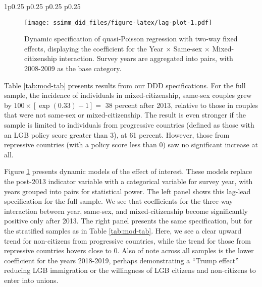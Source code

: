 \documentclass[
  12pt,
]{article}
\begin{document}
\begin{table}[ht]
\begin{centerbox}
\begin{threeparttable}
\begin{tabularx}{1\textwidth}{p{} p{} p{} p{}}
 \tabularnewline[-0.5pt]


\hhline{}
\end{tabularx}
\end{threeparttable}\par\end{centerbox}

\end{table}
 

\begin{figure}
\centering
\texttt{[image: ssimm\_did\_files/figure-latex/lag-plot-1.pdf]}
\caption{\label{fig:lag-plot}Dynamic specification of quasi-Poisson regression with two-way fixed effects, displaying the coefficient for the Year × Same-sex × Mixed-citizenship interaction. Survey years are aggregated into pairs, with 2008-2009 as the base category.}
\end{figure}

Table \ref{tab:mod-tab} presents results from our DDD specifications. For the full sample, the incidence of individuals in mixed-citizenship, same-sex couples grew by \(100 \times [\exp(0.33) -1] =\) 38 percent after 2013, relative to those in couples that were not same-sex or mixed-citizenship. The result is even stronger if the sample is limited to individuals from progressive countries (defined as those with an LGB policy score greater than 3), at 61 percent. However, those from repressive countries (with a policy score less than 0) saw no significant increase at all.

Figure \ref{fig:lag-plot} presents dynamic models of the effect of interest. These models replace the post-2013 indicator variable with a categorical variable for survey year, with years grouped into pairs for statistical power. The left panel shows this lag-lead specification for the full sample. We see that coefficients for the three-way interaction between year, same-sex, and mixed-citizenship become significantly positive only after 2013. The right panel presents the same specification, but for the stratified samples as in Table \ref{tab:mod-tab}. Here, we see a clear upward trend for non-citizens from progressive countries, while the trend for those from repressive countries hovers close to 0. Also of note across all samples is the lower coefficient for the years 2018-2019, perhaps demonstrating a ``Trump effect'' reducing LGB immigration or the willingness of LGB citizens and non-citizens to enter into unions.
\end{document}
